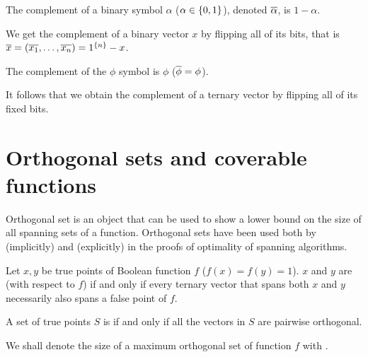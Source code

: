 \begin{definition}
The complement of a binary symbol $\alpha$
($\alpha \in \{0, 1\}$),
denoted $\overline{\alpha}$,
is $1 - \alpha$.

We get the complement of a binary vector $x$
by flipping all of its bits,
that is $\overline{x}
= (\overline{x_1}, \ldots, \overline{x_n})
= 1^{\{n\}} - x$.

The complement of the $\phi$ symbol is $\phi$
($\overline{\phi} = \phi$).

It follows that
we obtain the complement of a ternary vector
by flipping all of its fixed bits.
\end{definition}

\section{Orthogonal sets and coverable functions}

Orthogonal set is an object
that can be used to show a lower bound on the size of all spanning sets of a function.
Orthogonal sets have been used both
by \citet{Schieber2005154} (implicitly)
and \citet{Dubovsky2012} (explicitly)
in the proofs of optimality of spanning algorithms.

\begin{definition}
Let $x, y$ be true points of Boolean function $f$
($f(x) = f(y) = 1$).
$x$ and $y$ are 
(with respect to $f$)
if and only if
every ternary vector that spans both $x$ and $y$
necessarily also spans a false point of $f$.

A set of true points $S$ is 
if and only if
all the vectors in $S$ are pairwise orthogonal.

We shall denote the size of
a maximum orthogonal set
of function $f$
with .
\end{definition}



